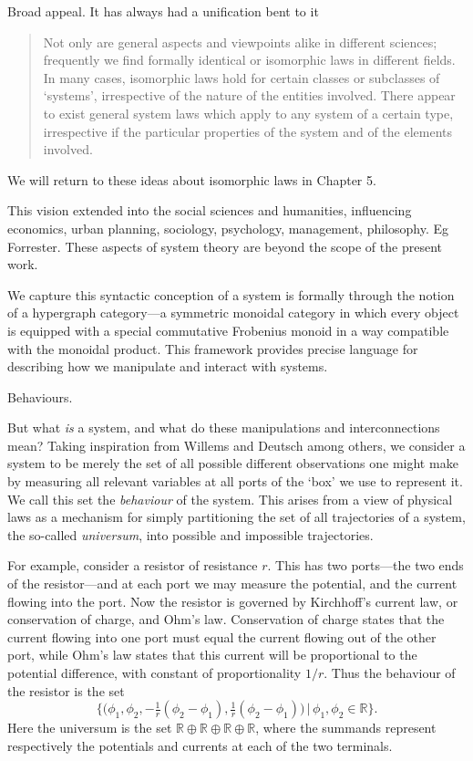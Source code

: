 Broad appeal. It has always had a unification bent to it \cite{Ber50}

\begin{quotation}
  Not only are general aspects and viewpoints alike in different sciences;
  frequently we find formally identical or isomorphic laws in different fields.
  In many cases, isomorphic laws hold for certain classes or subclasses of
  `systems', irrespective of the nature of the entities involved. There appear
  to exist general system laws which apply to any system of a certain type,
  irrespective if the particular properties of the system and of the elements
  involved.
\end{quotation}
We will return to these ideas about isomorphic laws in Chapter 5.

This vision extended into the social sciences and humanities, influencing
economics, urban planning, sociology, psychology, management, philosophy. Eg
Forrester. These aspects of system theory are beyond the scope of the present
work.


We capture this syntactic conception of a system is formally through the notion
of a hypergraph category---a symmetric monoidal category in which every object
is equipped with a special commutative Frobenius monoid in a way compatible with
the monoidal product. This framework provides precise language for describing
how we manipulate and interact with systems.

Behaviours.

But what \emph{is} a system, and what do these manipulations and
interconnections mean? Taking inspiration from Willems \cite{Wi} and Deutsch
\cite{Deu} among others, we consider a system to be merely the set of all possible
different observations one might make by measuring all relevant variables at all
ports of the `box' we use to represent it.  We call this set the
\emph{behaviour} of the system. This arises from a view of physical laws as a
mechanism for simply partitioning the set of all trajectories of a system, the
so-called \emph{universum}, into possible and impossible trajectories.

For example, consider a resistor of resistance $r$. This has two ports---the two
ends of the resistor---and at each port we may measure the potential, and the
current flowing into the port. Now the resistor is governed by Kirchhoff's
current law, or conservation of charge, and Ohm's law. Conservation of charge
states that the current flowing into one port must equal the current flowing out
of the other port, while Ohm's law states that this current will be proportional
to the potential difference, with constant of proportionality $1/r$. Thus the
behaviour of the resistor is the set 
\[
  \big\{\big(\phi_1,\phi_2,
    -\tfrac1r(\phi_2-\phi_1),\tfrac1r(\phi_2-\phi_1)\big)\,\big\vert\,
    \phi_1,\phi_2 \in \mathbb{R}\big\}.
\]
Here the universum is the set
$\mathbb{R}\oplus\mathbb{R}\oplus\mathbb{R}\oplus\mathbb{R}$, where the
summands represent respectively the potentials and currents at each of the two
terminals.

